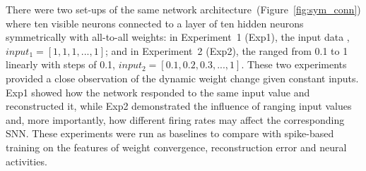 There were two set-ups of the same network architecture~(Figure~\ref{fig:sym_conn}) where ten visible neurons connected to a layer of ten hidden neurons symmetrically with all-to-all weights: in Experiment~1 (Exp1), \DIFdelbegin {}\DIFdelend \DIFaddbegin {}\DIFaddend the input data \DIFdelbegin {}\DIFdelend \DIFaddbegin {}, $input_1 = [1, 1, 1,...,1]$; and in Experiment~2 (Exp2), the \DIFdelbegin {}\DIFdelend \DIFaddbegin {}\DIFaddend ranged from 0.1 to 1 linearly with steps of 0.1, $input_2 = [0.1, 0.2, 0.3,...,1]$.
\DIFaddbegin {}\DIFaddend These two experiments provided a close observation of the dynamic weight change given constant inputs.
Exp1 showed how the network responded to the same input value and reconstructed it, while Exp2 demonstrated the influence of ranging input values and, more importantly, how different firing rates may affect the corresponding SNN.
These experiments were run as baselines to compare with spike-based training on the features of weight convergence, reconstruction error and neural activities.


